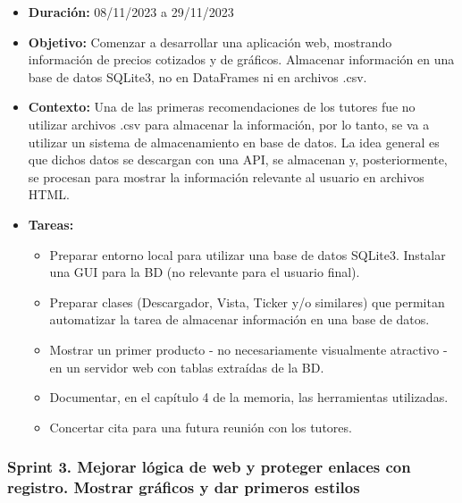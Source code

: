 \begin{itemize}
\item  
\textbf{Duración:} 08/11/2023 a 29/11/2023

\item
\textbf{Objetivo:} Comenzar a desarrollar una aplicación web, mostrando información de precios cotizados y de gráficos. Almacenar información en una base de datos SQLite3, no en DataFrames ni en archivos .csv. 

\item
\textbf{Contexto:} Una de las primeras recomendaciones de los tutores fue no utilizar archivos .csv para almacenar la información, por lo tanto, se va a utilizar un sistema de almacenamiento en base de datos. La idea general es que dichos datos se descargan con una API, se almacenan y, posteriormente, se procesan para mostrar la información relevante al usuario en archivos HTML. 

\item
\textbf{Tareas:}
	\begin{itemize}
	\tightlist
	\item 
	Preparar entorno local para utilizar una base de datos SQLite3. Instalar una GUI para la BD (no relevante para el usuario final). 
	\item 	
	Preparar clases (Descargador, Vista, Ticker y/o similares) que permitan automatizar la tarea de almacenar información en una base de datos. 
	\item 
	Mostrar un primer producto - no necesariamente visualmente atractivo - en un servidor web con tablas extraídas de la BD. 
  	\item 
  	Documentar, en el capítulo 4 de la memoria, las herramientas utilizadas. 
  	\item 
  	Concertar cita para una futura reunión con los tutores. 
  	\end{itemize}
\end{itemize}


\subsubsection{Sprint 3. Mejorar lógica de web y proteger enlaces con registro. Mostrar gráficos y dar primeros estilos}

